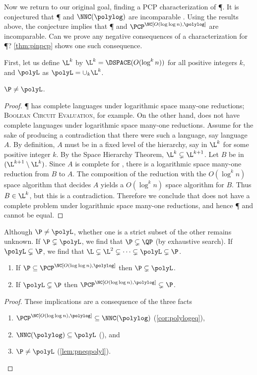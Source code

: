 \documentclass{article}
\newcommand{\loglog}{\log \log}
\begin{document}
Now we return to our original goal, finding a PCP characterization of \P.
It is conjectured that \P{} and $\NNC(\polylog)$ are incomparable \cite{wolf94}.
Using the results above, the conjecture implies that \P{} and $\PCP^\NC[O(\loglog n), \polylog]$ are incomparable.
Can we prove any negative consequences of a \PCP{} characterization for \P?
\autoref{thm:pinpcp} shows one such consequence.

First, let us define $\L^k$ by $\L^k = \DSPACE(O(\log^k n))$ for all positive integers $k$, and $\polyL$ as $\polyL = \cup_{k} \L^k$.
\begin{lemma}\label{lem:pneqpolyl}
  $\P \neq \polyL$.
\end{lemma}
\begin{proof}
  \P{} has complete languages under logarithmic space many-one reductions; \textsc{Boolean Circuit Evaluation}, for example.
  On the other hand, \polyL{} does not have complete languages under logarithmic space many-one reductions.
  Assume for the sake of producing a contradiction that there were such a language, say language $A$.
  By definition, $A$ must be in a fixed level of the \polyL{} hierarchy, say in $\L^k$ for some positive integer $k$.
  By the Space Hierarchy Theorem, $\L^k \subsetneq \L^{k + 1}$.
  Let $B$ be in $(\L^{k + 1} \setminus \L^k)$.
  Since $A$ is complete for \polyL, there is a logarithmic space many-one reduction from $B$ to $A$.
  The composition of the reduction with the $O(\log^k n)$ space algorithm that decides $A$ yields a $O(\log^k n)$ space algorithm for $B$.
  Thus $B \in \L^k$, but this is a contradiction.
  Therefore we conclude that \polyL{} does not have a complete problem under logarithmic space many-one reductions, and hence \P{} and \polyL{} cannot be equal.
\end{proof}

Although $\P \neq \polyL$, whether one is a strict subset of the other remains unknown.
If $\P \subsetneq \polyL$, we find that $\P \subsetneq \QP$ (by exhaustive search).
If $\polyL \subsetneq \P$, we find that $\L \subsetneq \L^2 \subsetneq \dotsb \subsetneq \polyL \subsetneq \P$.

\begin{theorem}\label{thm:pinpcp}
  \mbox{}
  \begin{enumerate}
  \item If $\P \subseteq \PCP^\NC[O(\loglog n), \polylog]$ then $\P \subsetneq \polyL$.
  \item If $\polyL \subsetneq \P$ then $\PCP^\NC[O(\loglog n), \polylog] \subsetneq \P$.
  \end{enumerate}
\end{theorem}
\begin{proof}
  These implications are a consequence of the three facts
  \begin{enumerate}
  \item $\PCP^\NC[O(\loglog n), \polylog] \subseteq \NNC(\polylog)$ (\autoref{cor:polylogeq}),
  \item $\NNC(\polylog) \subseteq \polyL$ (\cite[Corollary~3.2]{wolf94}), and
  \item $\P \neq \polyL$ (\autoref{lem:pneqpolyl}). \qedhere
  \end{enumerate}
\end{proof}
\end{document}
